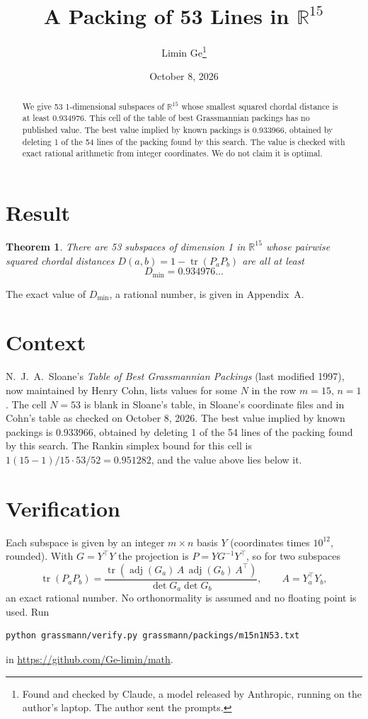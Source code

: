 \documentclass[11pt,a4paper]{article}
\title{A Packing of 53 Lines in $\mathbb{R}^{15}$}
\author{Limin Ge\thanks{Found and checked by Claude, a model released by Anthropic, running on the author's laptop. The author sent the prompts.}}
\date{October 8, 2026}
\newtheorem*{theorem}{Theorem}
\begin{document}
\maketitle
\begin{abstract}
We give 53 1-dimensional subspaces of $\mathbb{R}^{15}$ whose smallest squared chordal distance is at least 0.934976. This cell of the table of best Grassmannian packings has no published value. The best value implied by known packings is 0.933966, obtained by deleting 1 of the 54 lines of the packing found by this search. The value is checked with exact rational arithmetic from integer coordinates. We do not claim it is optimal.
\end{abstract}

\section{Result}
\begin{theorem}
There are 53 subspaces of dimension 1 in $\mathbb{R}^{15}$ whose pairwise squared chordal distances $D(a,b) = 1 - \operatorname{tr}(P_aP_b)$ are all at least
\[ D_{\min} = 0.934976\ldots \]
\end{theorem}
The exact value of $D_{\min}$, a rational number, is given in Appendix~A.


\section{Context}
N.~J.~A.~Sloane's \emph{Table of Best Grassmannian Packings} (last modified 1997), now maintained by Henry Cohn, lists values for some $N$ in the row $m=15$, $n=1$. The cell $N=53$ is blank in Sloane's table, in Sloane's coordinate files and in Cohn's table as checked on October 8, 2026. The best value implied by known packings is 0.933966, obtained by deleting 1 of the 54 lines of the packing found by this search. The Rankin simplex bound for this cell is $1(15-1)/15\cdot 53/52 = 0.951282$, and the value above lies below it.


\section{Verification}
Each subspace is given by an integer $m\times n$ basis $Y$ (coordinates times $10^{12}$, rounded). With $G=Y^\top Y$ the projection is $P=YG^{-1}Y^\top$, so for two subspaces
\[ \operatorname{tr}(P_aP_b)=\frac{\operatorname{tr}(\operatorname{adj}(G_a)\,A\,\operatorname{adj}(G_b)\,A^\top)}{\det G_a\det G_b},\qquad A=Y_a^\top Y_b, \]
an exact rational number. No orthonormality is assumed and no floating point is used. Run
\begin{verbatim}
python grassmann/verify.py grassmann/packings/m15n1N53.txt
\end{verbatim}
in \url{https://github.com/Ge-limin/math}.
\end{document}
